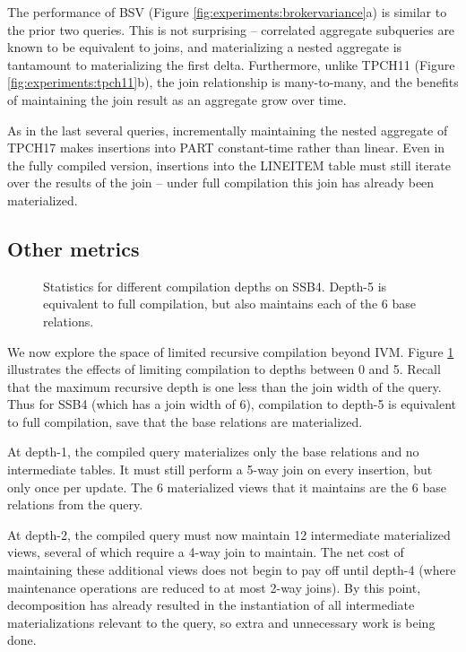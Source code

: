 The performance of BSV (Figure \ref{fig:experiments:brokervariance}a) is similar to the prior two queries.  This is not surprising -- correlated aggregate subqueries are known to be equivalent to joins, and materializing a nested aggregate is tantamount to materializing the first delta.  Furthermore, unlike TPCH11 (Figure \ref{fig:experiments:tpch11}b), the join relationship is many-to-many, and the benefits of maintaining the join result as an aggregate grow over time.

As in the last several queries, incrementally maintaining the nested aggregate of TPCH17 makes insertions into PART constant-time rather than linear.  Even in the fully compiled version, insertions into the LINEITEM table must still iterate over the results of the join -- under full compilation this join has already been materialized.

\subsection{Other metrics}
\label{sec:experiments:othermetrics}

\begin{figure}
\begin{center}
\resizebox{3.4in}{!}{

}
\caption{Statistics for different compilation depths on SSB4.  Depth-5 is equivalent to full compilation, but also maintains each of the 6 base relations.}
\label{fig:experiments:ssb4depth}
\end{center}
\vspace*{-0.2in}
\end{figure}
We now explore the space of limited recursive compilation beyond IVM.  Figure \ref{fig:experiments:ssb4depth} illustrates the effects of limiting compilation to depths between 0 and 5.  Recall that the maximum recursive depth is one less than the join width of the query.  Thus for SSB4 (which has a join width of 6), compilation to depth-5 is equivalent to full compilation, save that the base relations are materialized.

At depth-1, the compiled query materializes only the base relations and no intermediate tables.  It must still perform a 5-way join on every insertion, but  only once per update.  The 6 materialized views that it maintains are the 6 base relations from the query.  

At depth-2, the compiled query must now maintain 12 intermediate materialized views, several of which require a 4-way join to maintain.  The net cost of maintaining these additional views does not begin to pay off until depth-4 (where maintenance operations are reduced to at most 2-way joins).  By this point, decomposition has already resulted in the instantiation of all intermediate materializations relevant to the query, so extra and unnecessary work is being done.  


